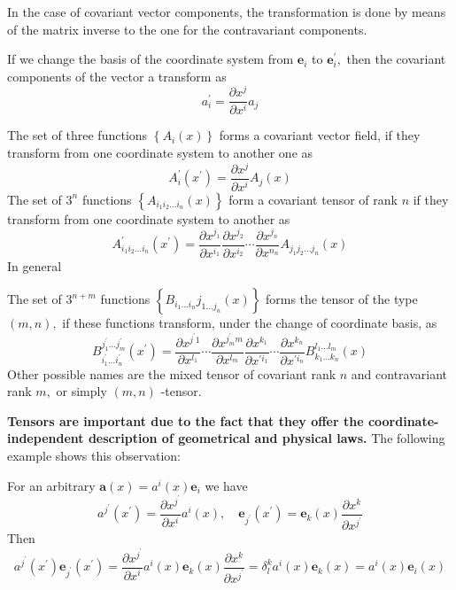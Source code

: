 In the case of covariant vector components, the transformation is done by means of the matrix inverse to the one for the contravariant components.
\begin{thm}
If we change the basis of the coordinate system from $\mathbf{e}_{i}$ to $\mathbf{e}_{i}^{\prime},$ then the covariant components of the vector a transform as
\begin{equation}
a_{i}^{\prime}=\frac{\partial x^{j}}{\partial x^{i}} a_{j}
\end{equation}
\end{thm}

 The set of three functions $\left\{A_{i}(x)\right\}$ forms a covariant vector field, if they transform from one coordinate system to another one as
 \begin{equation}
A_{i}^{\prime}\left(x^{\prime}\right)=\frac{\partial x^{j}}{\partial x^{i}} A_{j}(x)
\end{equation}
The set of $3^{n}$ functions $\left\{A_{i_{1} i_{2} \ldots i_{n}}(x)\right\}$ form a covariant tensor of rank $n$ if they transform from one coordinate system to another as
\begin{equation}
A_{i_{1} i_{2} \ldots i_{n}}^{\prime}\left(x^{\prime}\right)=\frac{\partial x^{j_{1}}}{\partial x^{i_{1}}} \frac{\partial x^{j_{2}}}{\partial x^{i_{2}}} \cdots \frac{\partial x^{j_{n}}}{\partial x^{n_{n}}} A_{j_{1} j_{2} \ldots j_{n}}(x)
\end{equation}
In general
\begin{qt}
The set of $3^{n+m}$ functions $\left\{B_{i_{1} \ldots i_{n}} j_{1 \ldots j_{n}}(x)\right\}$ forms the tensor of the type $(m, n),$ if these functions transform, under the change of coordinate basis, as
\begin{equation}
B_{i_{1}^{\prime} \ldots i_{n}^{\prime}} ^{j_{1}^{\prime} \ldots j_{m}^{\prime}}\left(x^{\prime}\right)=\frac{\partial x^{j^{\prime} 1}}{\partial x^{l_{1}}} \cdots \frac{\partial x^{j_{m}^{\prime} m}}{\partial x^{l_{m}}} \frac{\partial x^{k_{1}}}{\partial x^{\prime i_{1}}} \cdots \frac{\partial x^{k_{n}}}{\partial x^{\prime i_{n}}} B_{k_{1} \ldots k_{n}}^{l_{1} \ldots l_{m}}(x)
\end{equation}
Other possible names are the mixed tensor of covariant rank $n$ and contravariant rank $m,$ or simply $(m, n)$ -tensor.
\end{qt}
\textbf{Tensors are important due to the fact that they offer the coordinate-independent description of geometrical and physical laws.} The following example shows this observation:
\begin{example}
For an arbitrary $\mathbf{a}(x)=a^{i}(x) \mathbf{e}_{i}$ we have
$$
a^{j^{\prime}}\left(x^{\prime}\right)=\frac{\partial x^{j^{\prime}}}{\partial x^{i}} a^{i}(x), \quad \mathbf{e}_{j^{\prime}}\left(x^{\prime}\right)=\mathbf{e}_{k}(x) \frac{\partial x^{k}}{\partial x^{j^{\prime}}}
$$
Then
$$
a^{j^{\prime}}\left(x^{\prime}\right) \mathbf{e}_{j^{\prime}}\left(x^{\prime}\right)=\frac{\partial x^{j^{\prime}}}{\partial x^{i}} a^{i}(x) \mathbf{e}_{k}(x) \frac{\partial x^{k}}{\partial x^{j^{\prime}}}=\delta_{l}^{k} a^{i}(x) \mathbf{e}_{k}(x)=a^{i}(x) \mathbf{e}_{i}(x)
$$
\end{example}


